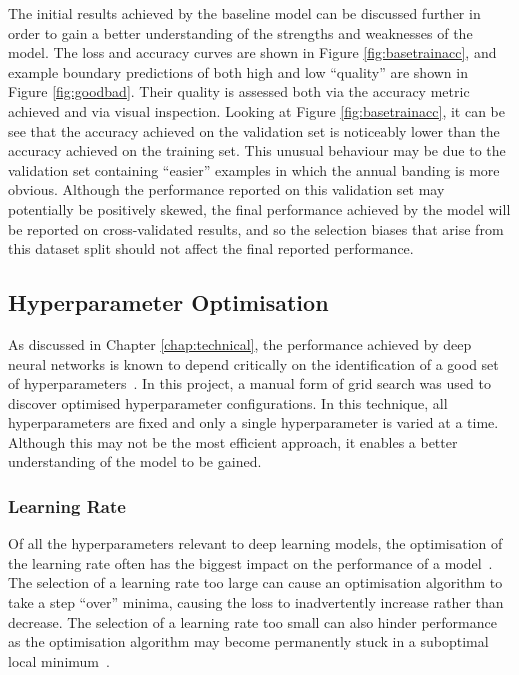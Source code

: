 The initial results achieved by the baseline model can be discussed further in order to gain a better understanding of the strengths and weaknesses of the model. The loss and accuracy curves are shown in Figure \ref{fig:basetrainacc}, and example boundary predictions of both high and low ``quality'' are shown in Figure \ref{fig:goodbad}. Their quality is assessed both via the accuracy metric achieved and via visual inspection. Looking at Figure \ref{fig:basetrainacc}, it can be see that the accuracy achieved on the validation set is noticeably lower than the accuracy achieved on the training set. This unusual behaviour may be due to the validation set containing ``easier'' examples in which the annual banding is more obvious. Although the performance reported on this validation set may potentially be positively skewed, the final performance achieved by the model will be reported on cross-validated results, and so the selection biases that arise from this dataset split should not affect the final reported performance.

\subsection{Hyperparameter Optimisation}

As discussed in Chapter \ref{chap:technical}, the performance achieved by deep neural networks is known to depend critically on the identification of a good set of hyperparameters~\cite{hyperparam, goodhyperparam}. In this project, a manual form of grid search was used to discover optimised hyperparameter configurations. In this technique, all hyperparameters are fixed and only a single hyperparameter is varied at a time. Although this may not be the most efficient approach, it enables a better understanding of the model to be gained.


\subsubsection{Learning Rate}

Of all the hyperparameters relevant to deep learning models, the optimisation of the learning rate often has the biggest impact on the performance of a model~\cite{bengio2012practical}. The selection of a learning rate too large can cause an optimisation algorithm to take a step ``over'' minima, causing the loss to inadvertently increase rather than decrease. The selection of a learning rate too small can also hinder performance as the optimisation algorithm may become permanently stuck in a suboptimal local minimum~\cite{goodfellow}.

